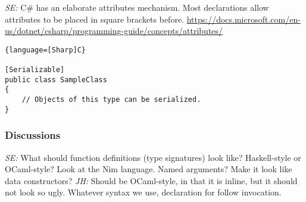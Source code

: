 \documentclass{article}
\begin{document}
\textit{SE:} C\# has an elaborate attributes mechanism.
Most declarations allow attributes to be placed in square brackets before.  \url{https://docs.microsoft.com/en-us/dotnet/csharp/programming-guide/concepts/attributes/}

\begin{lstlisting}{language=[Sharp]C}
  
[Serializable]
public class SampleClass
{
    // Objects of this type can be serialized.
} 
\end{lstlisting}

\subsubsection{Discussions}

\textit{SE:} What should function definitions (type signatures) look like?
Haskell-style or OCaml-style?  Look at the Nim language.  Named arguments?  Make
it look like data constructors?
\textit{JH:} Should be OCaml-style, in that it is inline, but it should not look
so ugly. Whatever syntax we use, declaration for follow invocation.
\end{document}
